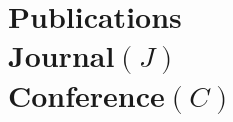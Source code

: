 \vspace{-1em}
\section{Publications\\ Journal$(J)$\\Conference$(C)$}
\vspace{-1em}

\vspace{-3em}
\sectionline